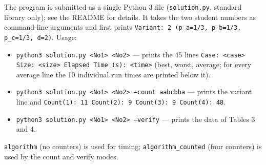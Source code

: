 \documentclass[11pt]{article}
\theoremstyle{remark}
\begin{document}
The program is submitted as a single Python 3 file (\texttt{solution.py}, standard library only); see
the README for details. It takes the two student numbers as command-line arguments and first
prints \texttt{Variant: 2 (p\_a=1/3, p\_b=1/3, p\_c=1/3, d=2)}. Usage:
\begin{itemize}[nosep]
\item \texttt{python3 solution.py <No1> <No2>} --- prints the 45 lines
  \texttt{Case: <case> Size: <size> Elapsed Time (s): <time>} (best, worst, average; for every
  average line the 10 individual run times are printed below it).
\item \texttt{python3 solution.py <No1> <No2> --count aabcbba} --- prints the variant line
  and \texttt{Count(1): 11 Count(2): 9 Count(3): 9 Count(4): 48}.
\item \texttt{python3 solution.py <No1> <No2> --verify} --- prints the data of Tables 3 and 4.
\end{itemize}
\texttt{algorithm} (no counters) is used for timing; \texttt{algorithm\_counted} (four
counters) is used by the count and verify modes.
\end{document}
